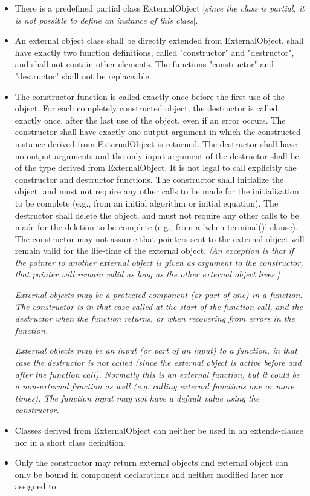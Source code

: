 \begin{itemize}
\item
  There is a predefined partial class ExternalObject {[}\emph{since the class
  is partial, it is not possible to define an instance of this class}{[}.
\item
  An external object class shall be directly extended from
  ExternalObject, shall have exactly two function definitions, called
  "constructor" and "destructor", and shall not contain other elements.
  The functions "constructor" and "destructor" shall not be replaceable.
\item
  The constructor function is called exactly once before the first use
  of the object. For each completely constructed object, the destructor
  is called exactly once, after the last use of the object, even if an
  error occurs. The constructor shall have exactly one output argument
  in which the constructed instance derived from ExternalObject is
  returned. The destructor shall have no output arguments and the only
  input argument of the destructor shall be of the type derived from
  ExternalObject. It is not legal to call explicitly the constructor and
  destructor functions. The constructor shall initialize the object, and
  must not require any other calls to be made for the initialization to
  be complete (e.g., from an initial algorithm or initial equation). The
  destructor shall delete the object, and must not require any other
  calls to be made for the deletion to be complete (e.g., from a 'when
  terminal()' clause). The constructor may not assume that pointers sent
  to the external object will remain valid for the life-time of the
  external object. \emph{{[}An exception is that if the pointer to
  another external object is given as argument to the constructor, that
  pointer will remain valid as long as the other external object
  lives.{]}}

  \emph{External objects may be a protected component (or part of one)
  in a function. The constructor is in that case called at the start of
  the function call, and the destructor when the function returns, or
  when recovering from errors in the function.}

  \emph{External objects may be an input (or part of an input) to a
  function, in that case the destructor is not called (since the
  external object is active before and after the function call).
  Normally this is an external function, but it could be a non-external
  function as well (e.g. calling external functions one or more times).
  The function input may not have a default value using the
  constructor.}
\item
  Classes derived from ExternalObject can neither be used in an
  extends-clause nor in a short class definition.
\item
  Only the constructor may return external objects and external object
  can only be bound in component declarations and neither modified later
  nor assigned to.


\end{itemize}
